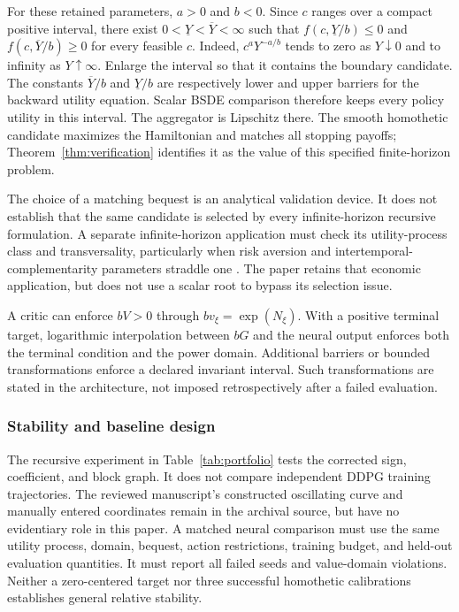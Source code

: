 For these retained parameters, $a>0$ and $b<0$. Since $c$ ranges over a compact positive interval, there exist $0<\underline Y<\overline Y<\infty$ such that $f(c,\underline Y/b)\leq0$ and $f(c,\overline Y/b)\geq0$ for every feasible $c$. Indeed, $c^aY^{-a/b}$ tends to zero as $Y\downarrow0$ and to infinity as $Y\uparrow\infty$. Enlarge the interval so that it contains the boundary candidate. The constants $\overline Y/b$ and $\underline Y/b$ are respectively lower and upper barriers for the backward utility equation. Scalar BSDE comparison therefore keeps every policy utility in this interval. The aggregator is Lipschitz there. The smooth homothetic candidate maximizes the Hamiltonian and matches all stopping payoffs; Theorem~\ref{thm:verification} identifies it as the value of this specified finite-horizon problem.

The choice of a matching bequest is an analytical validation device. It does not establish that the same candidate is selected by every infinite-horizon recursive formulation. A separate infinite-horizon application must check its utility-process class and transversality, particularly when risk aversion and intertemporal-complementarity parameters straddle one \citep{herdegen2021}. The paper retains that economic application, but does not use a scalar root to bypass its selection issue.

A critic can enforce $bV>0$ through $b v_\xi=\exp(N_\xi)$. With a positive terminal target, logarithmic interpolation between $bG$ and the neural output enforces both the terminal condition and the power domain. Additional barriers or bounded transformations enforce a declared invariant interval. Such transformations are stated in the architecture, not imposed retrospectively after a failed evaluation.

\subsubsection{Stability and baseline design}
The recursive experiment in Table~\ref{tab:portfolio} tests the corrected sign, coefficient, and block graph. It does not compare independent DDPG training trajectories. The reviewed manuscript's constructed oscillating curve and manually entered coordinates remain in the archival source, but have no evidentiary role in this paper. A matched neural comparison must use the same utility process, domain, bequest, action restrictions, training budget, and held-out evaluation quantities. It must report all failed seeds and value-domain violations. Neither a zero-centered target nor three successful homothetic calibrations establishes general relative stability.

